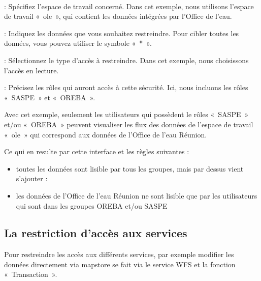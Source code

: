 \documentclass[letterpaper,10pt,french]{sphinxmanual}
\let\sphinxpxdimen\pdfpxdimen\else\newdimen\sphinxpxdimen
\begin{document}
\noindent{\hspace*{\fill}\sphinxincludegraphics[width=700\sphinxpxdimen]{{geos_secu}.png}\hspace*{\fill}}

\sphinxAtStartPar
 

\sphinxAtStartPar
{} : Spécifiez l’espace de travail concerné. Dans cet exemple, nous utilisons l’espace de travail « ole »,
qui contient les données intégrées par l’Office de l’eau.

\sphinxAtStartPar
{} : Indiquez les données que vous souhaitez restreindre. Pour cibler toutes les données, vous pouvez utiliser le symbole « * ».

\sphinxAtStartPar
{} : Sélectionnez le type d’accès à restreindre. Dans cet exemple, nous choisissons l’accès en lecture.

\sphinxAtStartPar
{} : Précisez les rôles qui auront accès à cette sécurité. Ici, nous incluons les rôles « SASPE » et « OREBA ».

\sphinxAtStartPar
Avec cet exemple, seulement les utilisateurs qui possèdent le rôles « SASPE » et/ou « OREBA » peuvent visualiser les flux des données de l’espace de travail « ole »
qui correspond aux données de l’Office de l’eau Réunion.

\sphinxAtStartPar
Ce qui en resulte par cette interface et les règles suivantes :
\begin{itemize}
\item {} 
\sphinxAtStartPar
toutes les données sont lisible par tous les groupes, mais par dessus vient s’ajouter :

\item {} 
\sphinxAtStartPar
les données de l’Office de l’eau Réunion ne sont lisible que par les utilisateurs qui sont dans les groupes OREBA et/ou SASPE

\end{itemize}

\noindent{\hspace*{\fill}\sphinxincludegraphics[width=700\sphinxpxdimen]{{geos_result}.png}\hspace*{\fill}}


\subsection{La restriction d’accès aux services}
\label{\detokenize{doc_admin/services:la-restriction-d-acces-aux-services}}
\sphinxAtStartPar
Pour restreindre les accès aux différents services, par exemple modifier les données directement via mapstore se fait via le service WFS et la fonction « Transaction ».
\end{document}
